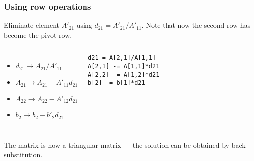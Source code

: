 \begin{frame}[fragile]
  \frametitle{Using row operations}
  Eliminate element $A'_{21}$ using $d_{21}=A'_{21}/A'_{11}$. Note that now the second row has become the pivot row.
  \vfill
  \vfill\pause
  \begin{columns}
  \begin{itemize}
    \item $d_{21}\rightarrow A_{21}/A'_{11}$
    \item $A_{21}\rightarrow A_{21}-A'_{11}d_{21}$
    \item $A_{22}\rightarrow A_{22}-A'_{12}d_{21}$
    \item $b_2   \rightarrow b_2   -b'_2   d_{21}$
  \end{itemize}
   \begin{lstlisting}
d21 = A[2,1]/A[1,1]
A[2,1] -= A[1,1]*d21
A[2,2] -= A[1,2]*d21
b[2] -= b[1]*d21
   \end{lstlisting}
  \end{columns}
  \pause
  \vfill
  The matrix is now a triangular matrix --- the solution can be obtained by back-substitution.
\end{frame}

